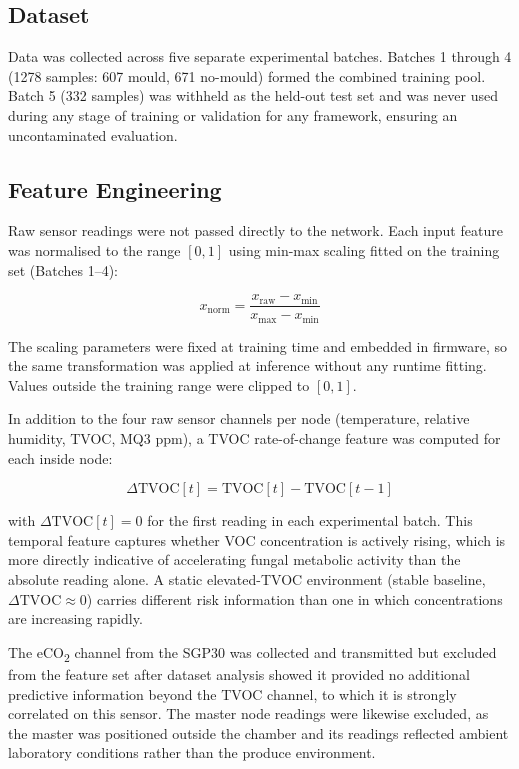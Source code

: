 \subsection{Dataset}

Data was collected across five separate experimental batches. Batches 1 through 4 (1278 samples: 607 mould, 671 no-mould) formed the combined training pool. Batch 5 (332 samples) was withheld as the held-out test set and was never used during any stage of training or validation for any framework, ensuring an uncontaminated evaluation.

\subsection{Feature Engineering}

Raw sensor readings were not passed directly to the network. Each input feature was normalised to the range $[0, 1]$ using min-max scaling fitted on the training set (Batches 1--4):

\begin{equation}
    x_{\text{norm}} = \frac{x_{\text{raw}} - x_{\text{min}}}{x_{\text{max}} - x_{\text{min}}}
    \label{eq:minmax}
\end{equation}

The scaling parameters were fixed at training time and embedded in firmware, so the same transformation was applied at inference without any runtime fitting. Values outside the training range were clipped to $[0, 1]$.

In addition to the four raw sensor channels per node (temperature, relative humidity, TVOC, MQ3 ppm), a TVOC rate-of-change feature was computed for each inside node:

\begin{equation}
    \Delta\text{TVOC}[t] = \text{TVOC}[t] - \text{TVOC}[t-1]
    \label{eq:delta_tvoc}
\end{equation}

with $\Delta\text{TVOC}[t] = 0$ for the first reading in each experimental batch. This temporal feature captures whether VOC concentration is actively rising, which is more directly indicative of accelerating fungal metabolic activity than the absolute reading alone. A static elevated-TVOC environment (stable baseline, $\Delta\text{TVOC} \approx 0$) carries different risk information than one in which concentrations are increasing rapidly.

The eCO\textsubscript{2} channel from the SGP30 was collected and transmitted but excluded from the feature set after dataset analysis showed it provided no additional predictive information beyond the TVOC channel, to which it is strongly correlated on this sensor. The master node readings were likewise excluded, as the master was positioned outside the chamber and its readings reflected ambient laboratory conditions rather than the produce environment.

